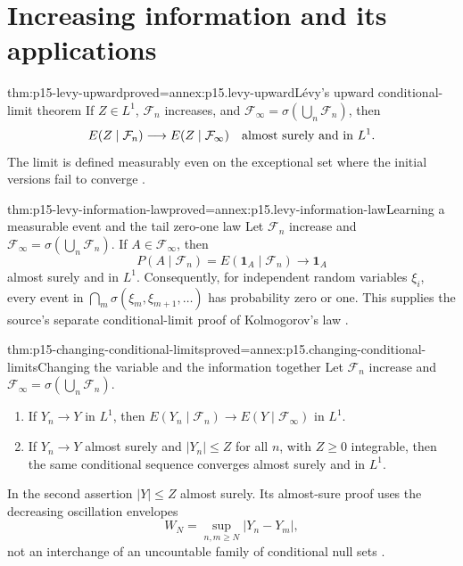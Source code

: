 \section{Increasing information and its applications}
\label{sec:p15-increasing-information}

\begin{hbtheorem}{thm:p15-levy-upward}{proved=annex:p15.levy-upward}{L\'evy's upward conditional-limit theorem}
If \(Z\in L^1\), \(\mathcal F_n\) increases, and
\(\mathcal F_\infty=\sigma(\bigcup_n\mathcal F_n)\), then
\[
       E(Z\mid\mathcal F_n)\longrightarrow
       E(Z\mid\mathcal F_\infty)
                  \quad\hbox{almost surely and in }L^1.
\]
The limit is defined measurably even on the exceptional set where
the initial versions fail to converge
\cite[thm.~4.6.8]{DurrettPTEAuthor2019}.
\end{hbtheorem}

\begin{hbtheorem}{thm:p15-levy-information-law}{proved=annex:p15.levy-information-law}{Learning a measurable event and the tail zero-one law}
Let \(\mathcal F_n\) increase and
\(\mathcal F_\infty=\sigma(\bigcup_n\mathcal F_n)\).
If \(A\in\mathcal F_\infty\), then
\[
                P(A\mid\mathcal F_n)=E(\mathbf1_A\mid\mathcal F_n)
                         \longrightarrow\mathbf1_A
\]
almost surely and in \(L^1\). Consequently, for independent random
variables \(\xi_i\), every event in
\(\bigcap_m\sigma(\xi_m,\xi_{m+1},\ldots)\) has probability zero or one.
This supplies the source's separate conditional-limit proof of
Kolmogorov's law
\cite[thm.~4.6.9 and continuation]{DurrettPTEAuthor2019}.
\end{hbtheorem}

\begin{hbtheorem}{thm:p15-changing-conditional-limits}{proved=annex:p15.changing-conditional-limits}{Changing the variable and the information together}
Let \(\mathcal F_n\) increase and
\(\mathcal F_\infty=\sigma(\bigcup_n\mathcal F_n)\).
\begin{enumerate}
\item If \(Y_n\to Y\) in \(L^1\), then
      \(E(Y_n\mid\mathcal F_n)\to E(Y\mid\mathcal F_\infty)\) in \(L^1\).
\item If \(Y_n\to Y\) almost surely and \(|Y_n|\leq Z\) for all \(n\),
      with \(Z\geq0\) integrable, then the same conditional sequence
      converges almost surely and in \(L^1\).
\end{enumerate}
In the second assertion \(|Y|\leq Z\) almost surely.
Its almost-sure proof uses the decreasing oscillation envelopes
\[
             W_N=\sup_{n,m\geq N}|Y_n-Y_m|,
\]
not an interchange of an uncountable family of conditional null sets
\cite[thm.~4.6.10, ex.~4.6.7]{DurrettPTEAuthor2019}.
\end{hbtheorem}

